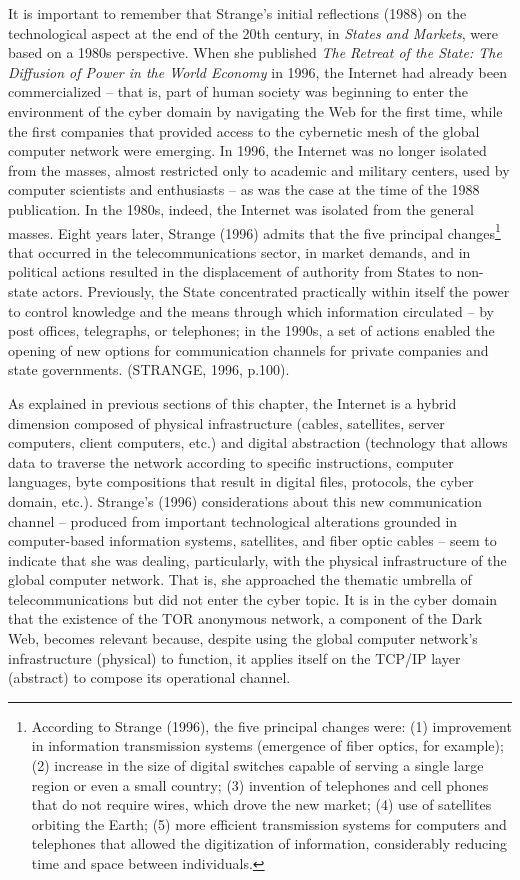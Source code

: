 It is important to remember that Strange's initial reflections (1988) on the technological aspect at the end of the 20th century, in \textit{States and Markets}, were based on a 1980s perspective. When she published \textit{The Retreat of the State: The Diffusion of Power in the World Economy} in 1996, the Internet had already been commercialized -- that is, part of human society was beginning to enter the environment of the cyber domain by navigating the Web for the first time, while the first companies that provided access to the cybernetic mesh of the global computer network were emerging. In 1996, the Internet was no longer isolated from the masses, almost restricted only to academic and military centers, used by computer scientists and enthusiasts -- as was the case at the time of the 1988 publication. In the 1980s, indeed, the Internet was isolated from the general masses. Eight years later, Strange (1996) admits that the five principal changes\footnote{According to Strange (1996), the five principal changes were: (1) improvement in information transmission systems (emergence of fiber optics, for example); (2) increase in the size of digital switches capable of serving a single large region or even a small country; (3) invention of telephones and cell phones that do not require wires, which drove the new market; (4) use of satellites orbiting the Earth; (5) more efficient transmission systems for computers and telephones that allowed the digitization of information, considerably reducing time and space between individuals.} that occurred in the telecommunications sector, in market demands, and in political actions resulted in the displacement of authority from States to non-state actors. Previously, the State concentrated practically within itself the power to control knowledge and the means through which information circulated -- by post offices, telegraphs, or telephones; in the 1990s, a set of actions enabled the opening of new options for communication channels for private companies and state governments. (STRANGE, 1996, p.100).

As explained in previous sections of this chapter, the Internet is a hybrid dimension composed of physical infrastructure (cables, satellites, server computers, client computers, etc.) and digital abstraction (technology that allows data to traverse the network according to specific instructions, computer languages, byte compositions that result in digital files, protocols, the cyber domain, etc.). Strange's (1996) considerations about this new communication channel -- produced from important technological alterations grounded in computer-based information systems, satellites, and fiber optic cables -- seem to indicate that she was dealing, particularly, with the physical infrastructure of the global computer network. That is, she approached the thematic umbrella of telecommunications but did not enter the cyber topic. It is in the cyber domain that the existence of the TOR anonymous network, a component of the Dark Web, becomes relevant because, despite using the global computer network's infrastructure (physical) to function, it applies itself on the TCP/IP layer (abstract) to compose its operational channel.

